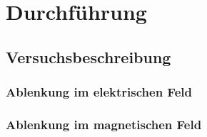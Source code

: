 \section{Durchführung}
\label{sec:Durchführung}



\subsection{Versuchsbeschreibung}
\label{sec:Versuchsbeschreibung}

\subsubsection{Ablenkung im elektrischen Feld}

\subsubsection{Ablenkung im magnetischen Feld}
